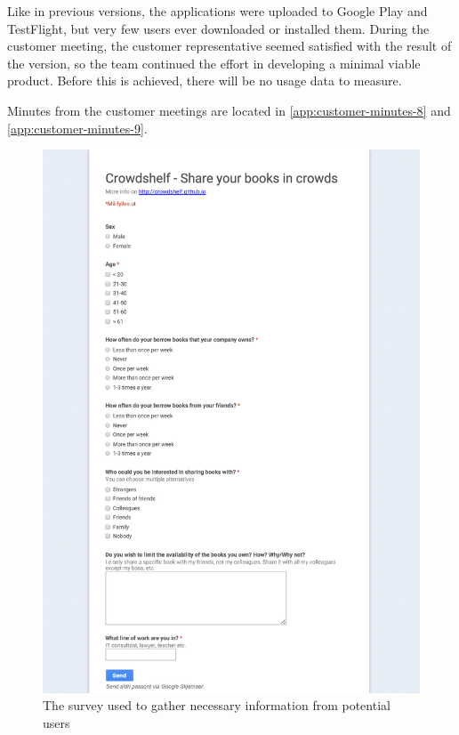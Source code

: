 Like in previous versions, the applications were uploaded to Google Play and TestFlight, but very few users ever downloaded or installed them. During the customer meeting, the customer representative seemed satisfied with the result of the version, so the team continued the effort in developing a minimal viable product. Before this is achieved, there will be no usage data to measure.

Minutes from the customer meetings are located in \ref{app:customer-minutes-8} and \ref{app:customer-minutes-9}.


\begin{figure}
\centering
\includegraphics[height=\textheight]{figs/v04/survey.png}
\caption{The survey used to gather necessary information from potential users}
\label{fig:0.4-survey}
\end{figure}

